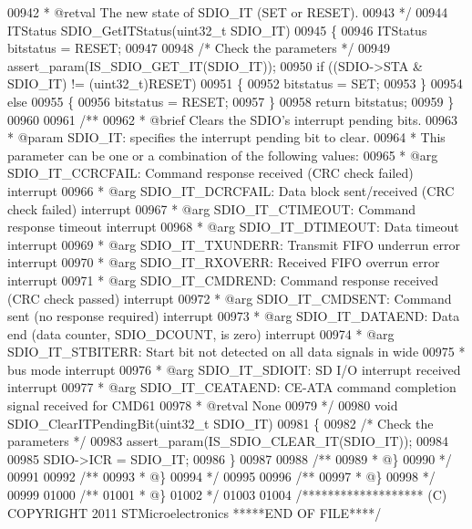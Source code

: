 \begin{DoxyCode}
00942 \textcolor{comment}{  * @retval The new state of SDIO\_IT (SET or RESET).}
00943 \textcolor{comment}{  */}
00944 ITStatus SDIO_GetITStatus(uint32\_t SDIO\_IT)
00945 \{
00946   ITStatus bitstatus = RESET;
00947 
00948   \textcolor{comment}{/* Check the parameters */}
00949   assert_param(IS\_SDIO\_GET\_IT(SDIO\_IT));
00950   \textcolor{keywordflow}{if} ((SDIO->STA & SDIO\_IT) != (uint32\_t)RESET)
00951   \{
00952     bitstatus = SET;
00953   \}
00954   \textcolor{keywordflow}{else}
00955   \{
00956     bitstatus = RESET;
00957   \}
00958   \textcolor{keywordflow}{return} bitstatus;
00959 \}
00960 
00961 \textcolor{comment}{/**}
00962 \textcolor{comment}{  * @brief  Clears the SDIO's interrupt pending bits.}
00963 \textcolor{comment}{  * @param  SDIO\_IT: specifies the interrupt pending bit to clear. }
00964 \textcolor{comment}{  *          This parameter can be one or a combination of the following values:}
00965 \textcolor{comment}{  *            @arg SDIO\_IT\_CCRCFAIL: Command response received (CRC check failed) interrupt}
00966 \textcolor{comment}{  *            @arg SDIO\_IT\_DCRCFAIL: Data block sent/received (CRC check failed) interrupt}
00967 \textcolor{comment}{  *            @arg SDIO\_IT\_CTIMEOUT: Command response timeout interrupt}
00968 \textcolor{comment}{  *            @arg SDIO\_IT\_DTIMEOUT: Data timeout interrupt}
00969 \textcolor{comment}{  *            @arg SDIO\_IT\_TXUNDERR: Transmit FIFO underrun error interrupt}
00970 \textcolor{comment}{  *            @arg SDIO\_IT\_RXOVERR:  Received FIFO overrun error interrupt}
00971 \textcolor{comment}{  *            @arg SDIO\_IT\_CMDREND:  Command response received (CRC check passed) interrupt}
00972 \textcolor{comment}{  *            @arg SDIO\_IT\_CMDSENT:  Command sent (no response required) interrupt}
00973 \textcolor{comment}{  *            @arg SDIO\_IT\_DATAEND:  Data end (data counter, SDIO\_DCOUNT, is zero) interrupt}
00974 \textcolor{comment}{  *            @arg SDIO\_IT\_STBITERR: Start bit not detected on all data signals in wide }
00975 \textcolor{comment}{  *                                   bus mode interrupt}
00976 \textcolor{comment}{  *            @arg SDIO\_IT\_SDIOIT:   SD I/O interrupt received interrupt}
00977 \textcolor{comment}{  *            @arg SDIO\_IT\_CEATAEND: CE-ATA command completion signal received for CMD61}
00978 \textcolor{comment}{  * @retval None}
00979 \textcolor{comment}{  */}
00980 \textcolor{keywordtype}{void} SDIO_ClearITPendingBit(uint32\_t SDIO\_IT)
00981 \{
00982   \textcolor{comment}{/* Check the parameters */}
00983   assert_param(IS\_SDIO\_CLEAR\_IT(SDIO\_IT));
00984 
00985   SDIO->ICR = SDIO\_IT;
00986 \}
00987 
00988 \textcolor{comment}{/**}
00989 \textcolor{comment}{  * @\}}
00990 \textcolor{comment}{  */}
00991 
00992 \textcolor{comment}{/**}
00993 \textcolor{comment}{  * @\}}
00994 \textcolor{comment}{  */}
00995 
00996 \textcolor{comment}{/**}
00997 \textcolor{comment}{  * @\}}
00998 \textcolor{comment}{  */}
00999 
01000 \textcolor{comment}{/**}
01001 \textcolor{comment}{  * @\}}
01002 \textcolor{comment}{  */}
01003 
01004 \textcolor{comment}{/******************* (C) COPYRIGHT 2011 STMicroelectronics *****END OF FILE****/}
\end{DoxyCode}
